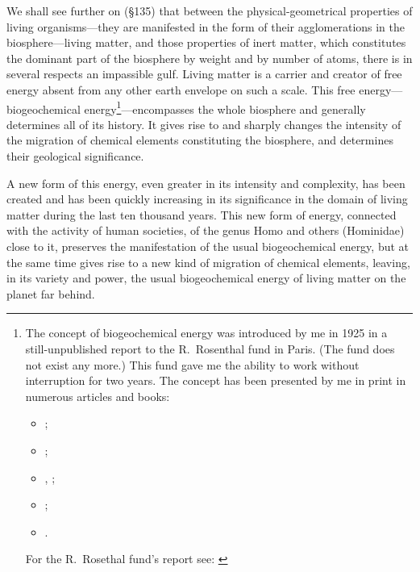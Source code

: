 We shall see further on (§135) that between the physical-geometrical
properties of living organisms---they are manifested in the form of their
agglomerations in the biosphere---living matter, and those properties of inert
matter, which constitutes the dominant part of the biosphere by weight and by
number of atoms, there is in several respects an impassible gulf.  Living
matter is a carrier and creator of free energy absent from any other earth
envelope on such a scale.  This free energy---biogeochemical
energy\footnote{
	The concept of biogeochemical energy was introduced by me in 1925 in a
	still-unpublished report to the R.~Rosenthal fund in Paris. (The fund
	does not exist any more.)  This fund gave me the ability to work
	without interruption for two years.  The concept has been presented by
	me in print in numerous articles and books:
	\begin{itemize}
	  \item \foreignlanguage{russian}{\cite[30--48]{vernadsky1926biosfera}};
	  \item \foreignlanguage{french}{\cite{vernadsky1926etudes1,
		  vernadsky1927etudes2}};
	  \item \foreignlanguage{russian}{\cite{vernadsky1926razmnozhenii1},
		  \cite{vernadsky1926razmnozhenii2}};
	  \item \foreignlanguage{french}{\cite{vernadsky1926multiplication1,
		  vernadsky1926multiplication2}};
	  \item \foreignlanguage{russian}{\cite{vernadsky1927bakteriofag}}.
	\end{itemize}
	 For the R.~Rosethal fund's report
	\foreignlanguage{russian}{} see:
	\foreignlanguage{russian}{\cite[555--602]{vernadsky1994zhivoe}}
}---encompasses the whole biosphere and generally determines all of its
history.  It gives rise to and sharply changes the intensity of the migration
of chemical elements constituting the biosphere, and determines their
geological significance.

A new form of this energy, even greater in its intensity and complexity, has
been created and has been quickly increasing in its significance in the domain
of living matter during the last ten thousand years.  This new form of energy,
connected with the activity of human societies, of the genus Homo and others
(Hominidae) close to it, preserves the manifestation of the usual
biogeochemical energy, but at the same time gives rise to a new kind of
migration of chemical elements, leaving, in its variety and power, the usual
biogeochemical energy of living matter on the planet far behind.

